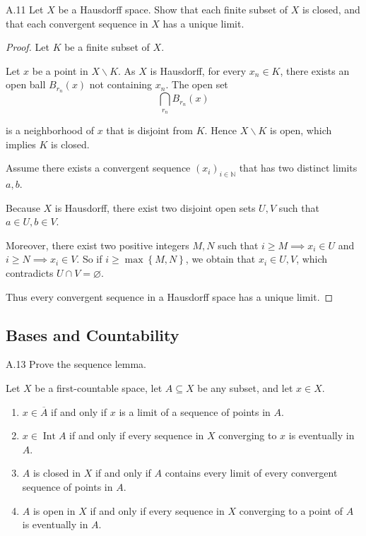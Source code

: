 \begin{exercise}{A.11}
    Let \( X \) be a Hausdorff space. Show that each finite subset of \( X \) is closed, and that each convergent sequence in \( X \) has a unique limit.
\end{exercise}

\begin{proof}
    Let \( K \) be a finite subset of \( X \).

    Let \( x \) be a point in \( X \smallsetminus K \). As \( X \) is Hausdorff, for every \( x_{n} \in K \), there exists an open ball \( B_{r_{n}}(x) \) not containing \( x_{n} \). The open set
    \[
        \bigcap_{r_{n}} B_{r_{n}}(x)
    \]

    is a neighborhood of \( x \) that is disjoint from \( K \). Hence \( X \smallsetminus K \) is open, which implies \( K \) is closed.

    \hrulefill%

    Assume there exists a convergent sequence \( {(x_{i})}_{i \in \mathbb{N}} \) that has two distinct limits \( a, b \).

    Because \( X \) is Hausdorff, there exist two disjoint open sets \( U, V \) such that \( a \in U, b \in V \).

    Moreover, there exist two positive integers \( M, N \) such that \( i \ge M \implies x_{i} \in U \) and \( i \ge N \implies x_{i} \in V \). So if \( i \ge \max\left\{ M, N \right\} \), we obtain that \( x_{i} \in U, V \), which contradicts \( U \cap V = \varnothing \).

    Thus every convergent sequence in a Hausdorff space has a unique limit.
\end{proof}

\subsection{Bases and Countability}

\begin{exercise}{A.13}
    Prove the sequence lemma.

    Let \( X \) be a first-countable space, let \( A \subseteq X \) be any subset, and let \( x \in X \).
    \begin{enumerate}[itemsep=0pt,label={(\alph*)}]
        \item \( x \in \overline{A} \) if and only if \( x \) is a limit of a sequence of points in \( A \).
        \item \( x \in \operatorname{Int} A \) if and only if every sequence in \( X \) converging to \( x \) is eventually in \( A \).
        \item \( A \) is closed in \( X \) if and only if \( A \) contains every limit of every convergent sequence of points in \( A \).
        \item \( A \) is open in \( X \) if and only if every sequence in \( X \) converging to a point of \( A \) is eventually in \( A \).
    \end{enumerate}
\end{exercise}

